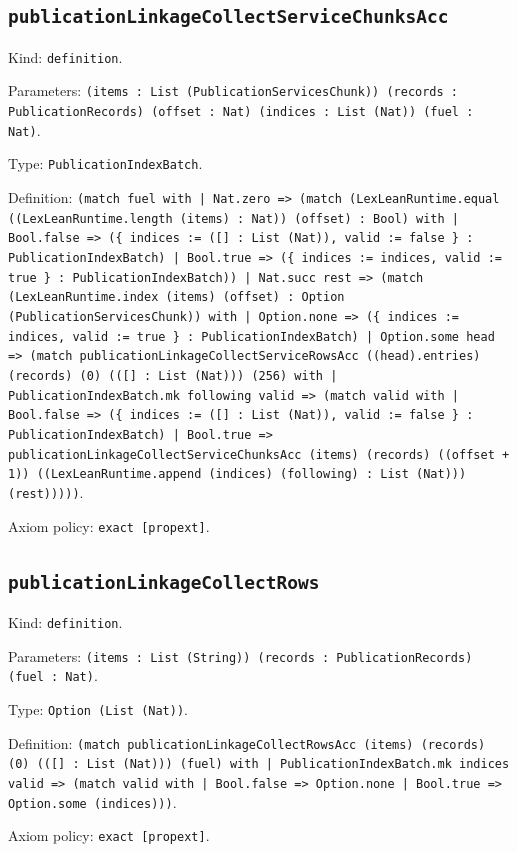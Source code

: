 \documentclass[11pt]{article}
\begin{document}
\subsection*{\texttt{publicationLinkageCollectServiceChunksAcc}}
\noindent Kind: \texttt{definition}.\par
\noindent Parameters: \texttt{(items : List (PublicationServicesChunk)) (records : PublicationRecords) (offset : Nat) (indices : List (Nat)) (fuel : Nat)}.\par
\noindent Type: \texttt{PublicationIndexBatch}.\par
\noindent Definition: \texttt{(match fuel with | Nat.zero => (match (LexLeanRuntime.equal ((LexLeanRuntime.length (items) : Nat)) (offset) : Bool) with | Bool.false => (\{ indices := ([] : List (Nat)), valid := false \} : PublicationIndexBatch) | Bool.true => (\{ indices := indices, valid := true \} : PublicationIndexBatch)) | Nat.succ rest => (match (LexLeanRuntime.index (items) (offset) : Option (PublicationServicesChunk)) with | Option.none => (\{ indices := indices, valid := true \} : PublicationIndexBatch) | Option.some head => (match publicationLinkageCollectServiceRowsAcc ((head).entries) (records) (0) (([] : List (Nat))) (256) with | PublicationIndexBatch.mk following valid => (match valid with | Bool.false => (\{ indices := ([] : List (Nat)), valid := false \} : PublicationIndexBatch) | Bool.true => publicationLinkageCollectServiceChunksAcc (items) (records) ((offset + 1)) ((LexLeanRuntime.append (indices) (following) : List (Nat))) (rest)))))}.\par
\noindent Axiom policy: \texttt{exact [propext]}.\par
\subsection*{\texttt{publicationLinkageCollectRows}}
\noindent Kind: \texttt{definition}.\par
\noindent Parameters: \texttt{(items : List (String)) (records : PublicationRecords) (fuel : Nat)}.\par
\noindent Type: \texttt{Option (List (Nat))}.\par
\noindent Definition: \texttt{(match publicationLinkageCollectRowsAcc (items) (records) (0) (([] : List (Nat))) (fuel) with | PublicationIndexBatch.mk indices valid => (match valid with | Bool.false => Option.none | Bool.true => Option.some (indices)))}.\par
\noindent Axiom policy: \texttt{exact [propext]}.\par
\end{document}
